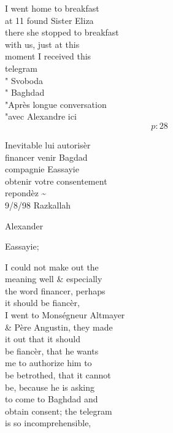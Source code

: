 \documentclass{report}
\begin{document}
	\par{
 	I went home to breakfast\ \\at 11 found Sister Eliza\ \\there she stopped to breakfast\ \\with us, just at this\ \\moment I received this\ \\telegram\ \\" Svoboda\ \\" Baghdad\ \\"Après longue conversation\ \\"avec Alexandre ici\ \\
  \[p: 28 \]

	}


	\par{
 	Inevitable lui autorisèr\ \\financer venir Bagdad\ \\compagnie Eassayie\ \\obtenir votre consentement\ \\repondèz \~{}\ \\9/8/98 Razkallah\ \\
	}

	\par{
 	Alexander\ \\
	}

	\par{
 	Eassayie;\ \\
	}

	\par{
 	I could not make out the\ \\meaning well \& especially\ \\the word financer, perhaps\ \\it should be fiancèr,\ \\I went to Monségneur Altmayer\ \\\& Père Angustin, they made\ \\it out that it should\ \\be fiancèr, that he wants\ \\me to authorize him to\ \\be betrothed, that it cannot\ \\be, because he is asking\ \\to come to Baghdad and\ \\obtain consent; the telegram\ \\is so incomprehensible,\ \\
	}
\end{document}

